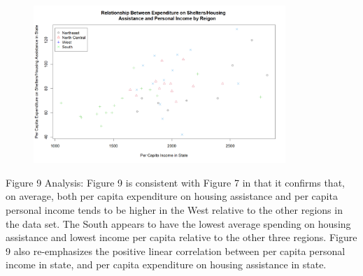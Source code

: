 \documentclass[12pt,letterpaper]{article}
\begin{document}
	\begin{figure}[h!]
		\centering
		\caption{\footnotesize}
		\label{fig:plot_9}
		\includegraphics[width=0.85\textwidth]{Figure2.3}
	\end{figure}
	\noindent
	Figure 9 Analysis: Figure 9 is consistent with Figure 7 in that it confirms that, on average, both per capita expenditure on housing assistance and per capita personal income tends to be higher in the West relative to the other regions in the data set. The South appears to have the lowest average spending on housing assistance and lowest income per capita relative to the other three regions. Figure 9 also re-emphasizes the positive linear correlation between per capita personal income in state, and per capita expenditure on housing assistance in state.
\end{document}
